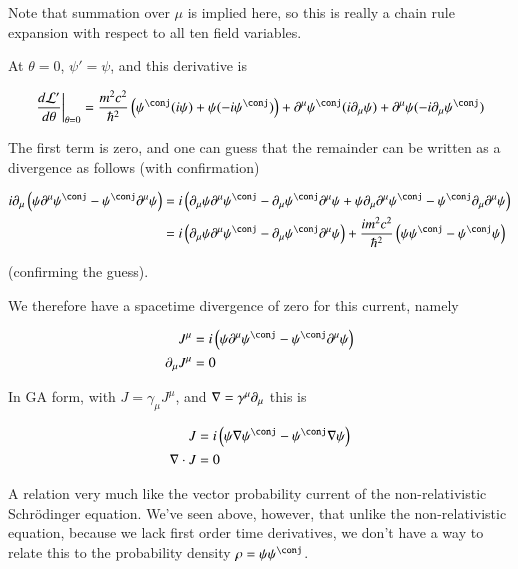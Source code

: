 \documentclass{article}
\begin{document}
Note that summation over $\mu$ is implied here, so this is really a chain rule expansion with respect to all ten field variables.

At $\theta=0$, $\psi' = \psi$, and this derivative is

\begin{align*}
{\left. \frac{d\LL'}{d\theta} \right\vert}_{\theta=0}
&=
\frac{m^2 c^2}{\hbar^2}\left( \psi^\conj (i \psi) + \psi (-i\psi^\conj) \right)
+ \partial^\mu \psi^\conj (i\partial_\mu \psi)
+ \partial^\mu \psi (-i \partial_\mu {\psi}^\conj) \\
\end{align*}

The first term is zero, and one can guess that the remainder can be written as a divergence as follows (with confirmation)

\begin{align*}
i \partial_\mu \left( 
\psi \partial^\mu \psi^\conj
-\psi^\conj \partial^\mu \psi
\right)
&=
i \left( 
\partial_\mu \psi \partial^\mu \psi^\conj
-\partial_\mu \psi^\conj \partial^\mu \psi
+\psi \partial_\mu \partial^\mu \psi^\conj
-\psi^\conj \partial_\mu \partial^\mu \psi
\right) \\
&=
i \left( 
\partial_\mu \psi \partial^\mu \psi^\conj
-\partial_\mu \psi^\conj \partial^\mu \psi \right)
+ \frac{ i m^2 c^2}{\hbar^2} \left( 
\psi \psi^\conj
-\psi^\conj \psi
\right) \\
\end{align*}

(confirming the guess).

We therefore have a spacetime divergence of zero for this current, namely

\begin{align}
J^\mu &=
i \left( 
\psi \partial^\mu \psi^\conj
-\psi^\conj \partial^\mu \psi
\right) \\
\partial_\mu J^\mu &= 0
\end{align}

In GA form, with $J = \gamma_\mu J^\mu$, and $\nabla = \gamma^\mu \partial_\mu$ this is

\begin{align}
J &=
i \left( 
\psi \grad \psi^\conj
-\psi^\conj \grad \psi
\right) \\
\grad \cdot J &= 0
\end{align}

A relation very much like the vector probability current of the non-relativistic Schr\"{o}dinger equation.  We've seen above, however, that 
unlike the non-relativistic equation, because we lack first order time derivatives, we don't have a way to relate this to the probability density
$\rho = \psi\psi^\conj$.
\end{document}
